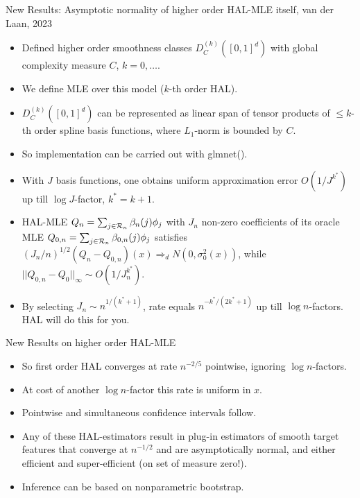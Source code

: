 \documentclass[t]{beamer}
\begin{document}
\begin{frame}{New Results: Asymptotic normality of higher order HAL-MLE itself, van der Laan, 2023}
\begin{itemize}
\item Defined higher order smoothness classes $D^{(k)}_C([0,1]^d)$ with global complexity measure $C$, $k=0,\ldots$.
\item We define MLE over this model ($k$-th order HAL).
\item $D^{(k)}_C([0,1]^d)$ can be represented as linear span of tensor products of $\leq k$-th order spline basis functions, where  $L_1$-norm is bounded by $C$.
\item So implementation can be carried out with glmnet().
\item With $J$ basis functions, one obtains uniform approximation error $O(1/J^{k^*})$ up till $\log J$-factor, $k^*=k+1$.
 \item HAL-MLE $Q_n=\sum_{j\in {\cal R}_n}\beta_n(j)\phi_j$ with $J_n$  non-zero coefficients of its oracle MLE  $Q_{0,n}=\sum_{j\in {\cal R}_n}\beta_{0,n}(j)\phi_j$ satisfies $(J_n/n)^{1/2}(Q_n-Q_{0,n})(x)\Rightarrow_d N(0,\sigma^2_0(x))$, while $|| Q_{0,n}-Q_0 ||_{\infty}\sim O(1/J_n^{k^*})$.
\item By selecting $J_n\sim n^{1/(k^*+1)}$, rate equals $n^{-k^*/(2k^*+1)}$ up till $\log n$-factors. HAL will do this for you.
\end{itemize}
\end{frame}

\begin{frame}{New Results on higher order HAL-MLE}
\begin{itemize}
\item So first order HAL converges at rate $n^{-2/5}$ pointwise, ignoring $\log n$-factors.
\item At cost of another $\log n$-factor this rate is uniform in $x$.
\item Pointwise and simultaneous  confidence intervals follow.
\item Any of these HAL-estimators result in plug-in estimators of smooth target features that converge at $n^{-1/2}$ and are asymptotically normal, and either efficient and super-efficient (on set of measure zero!).
\item Inference can be based on nonparametric bootstrap.
\end{itemize}
\end{frame}
\end{document}
